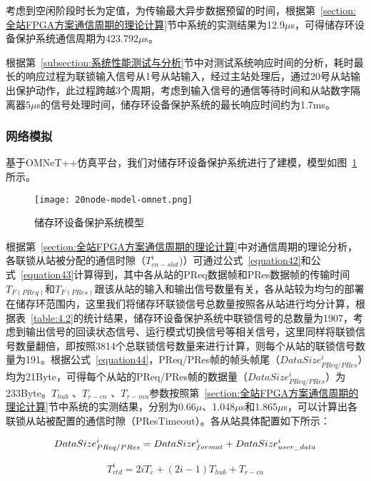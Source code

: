 考虑到空闲阶段时长为定值，为传输最大异步数据预留的时间，根据第~\ref{section:全站FPGA方案通信周期的理论计算}节中系统的实测结果为12.9$\mu$s，可得储存环设备保护系统通信周期为423.792$\mu$s。


根据第~\ref{subsection:系统性能测试与分析}节中对测试系统响应时间的分析，耗时最长的响应过程为联锁输入信号从1号从站输入，经过主站处理后，通过20号从站输出保护动作，此过程跨越3个周期，考虑到输入信号的通信等待时间和从站数字隔离器5$\mu$s的信号处理时间，储存环设备保护系统的最长响应时间约为1.7ms。

\subsubsection{网络模拟}

基于OMNeT++仿真平台，我们对储存环设备保护系统进行了建模，模型如图~\ref{fig:20node-model-omnet}所示。

\begin{figure}[!htb]
  \centering
  \texttt{[image: 20node-model-omnet.png]}
  \caption{储存环设备保护系统模型}
  \label{fig:20node-model-omnet}
\end{figure}

根据第~\ref{section:全站FPGA方案通信周期的理论计算}中对通信周期的理论分析，各联锁从站被分配的通信时隙（$T_{cn-slot}^{i}$)）可通过公式~\ref{equation42}和公式~\ref{equation43}计算得到，其中各从站的PReq数据帧和PRes数据帧的传输时间$T_{F(PReq)}$和$T_{F(PRes)}$跟该从站的输入和输出信号数量有关，各从站较为均匀的部署在储存环范围内，这里我们将储存环联锁信号总数量按照各从站进行均分计算，根据表~\ref{table:4.2}的统计结果，储存环设备保护系统中联锁信号的总数量为1907，考虑到输出信号的回读状态信号、运行模式切换信号等相关信号，这里同样将联锁信号数量翻倍，即按照3814个总联锁信号数量来进行计算，则每个从站的联锁信号数量为191。根据公式~\ref{equation44}，PReq/PRes帧的帧头帧尾（$DataSize_{PReq/PRes}^{i}$）均为21Byte，可得每个从站的PReq/PRes帧的数据量（$DataSize_{PReq/PRes}^{i}$）为233Byte。$T_{hub}$ 、$T_{r-cn}$ 、$T_{r-mn}$参数按照第~\ref{section:全站FPGA方案通信周期的理论计算}节中系统的实测结果，分别为0.66$\mu$、1.048$\mu$s和1.865$\mu$s，可以计算出各联锁从站被配置的通信时隙（PResTimeout）。各从站具体配置如下所示：

\begin{equation}
\label{equation41}
DataSize_{PReq/PRes}^{i} = DataSize_{format}^{i}+DataSize_{user\_data}^{i}\\
\end{equation}

\begin{equation}
\label{equation42}
T_{rtd}^{i}=2iT_{c}+(2i-1)T_{hub}+T_{r-cn}
\end{equation}

